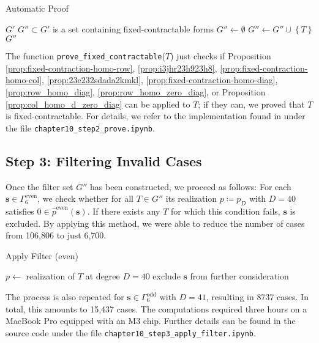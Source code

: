 \begin{algorithm}[H]
    \caption{Automatic Proof}
    \label{alg:autoproof}
    \begin{algorithmic}[1]
    \Require $G'$
\Ensure $G'' \subset G'$ is a set containing fixed-contractable forms
    \State \( G'' \gets \emptyset \)
            \State $G'' \gets G'' \cup \left\{ T \right\}$
        \EndIf        
    \EndFor
    \State \Return $G''$
\EndFunction
\end{algorithmic}
\end{algorithm}
The function \texttt{prove\_fixed\_contractable}($T$) just checks if Proposition \ref{prop:fixed-contraction-homo-row}, \ref{prop:i3jhr23h923h8}, \ref{prop:fixed-contraction-homo-col}, \ref{prop:23e232sdada2kmkl}, \ref{prop:fixed-contraction-homo-diag}, \ref{prop:row_homo_diag}, \ref{prop:row_homo_zero_diag}, or Proposition \ref{prop:col_homo_d_zero_diag} can be applied to \( T \); if they can, we proved that \( T \) is fixed-contractable. For details, we refer to the implementation found in \cite{ducrepo} under the file \texttt{chapter10\_step2\_prove.ipynb}. 


\subsection*{Step 3: Filtering Invalid Cases}

Once the filter set \( G'' \) has been constructed, we proceed as follows: For each \( \mathbf{s} \in \Gamma^{\mathrm{even}}_6 \), we check whether for all \( T \in G'' \) its realization \( p \coloneqq p_D \) with \( D = 40 \) satisfies \( 0 \in \hat p^{\mathrm{even}}(\mathbf{s}) \). If there exists any \( T \) for which this condition fails, \( \mathbf{s} \) is excluded. By applying this method, we were able to reduce the number of cases from 106,806 to just 6,700. 
\begin{algorithm}[H]
    \caption{Apply Filter (even)}
    \label{alg:filter}
    \begin{algorithmic}[1]
        \State \( p \gets \) realization of \( T \) at degree \( D = 40 \)
            \State exclude \( \mathbf{s} \) from further consideration
        \EndIf        
        \EndFor       
    \EndFor
\EndFunction
\end{algorithmic}
\end{algorithm}
The process is also repeated for \( \mathbf{s} \in \Gamma^{\mathrm{odd}}_6 \) with \( D = 41 \), resulting in 8737 cases. 
In total, this amounts to 15,437 cases. 
The computations required three hours on a MacBook Pro equipped with an M3 chip. Further details can be found in the source code \cite{ducrepo} under the file \texttt{chapter10\_step3\_apply\_filter.ipynb}.


